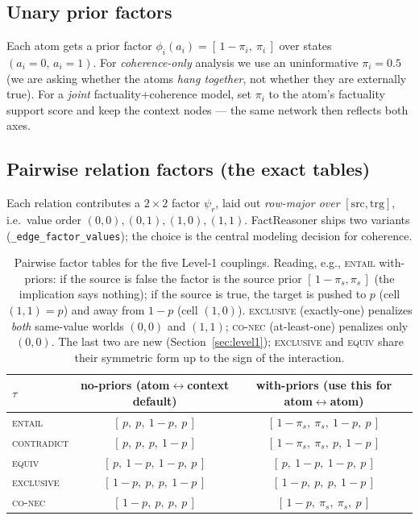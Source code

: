 \documentclass[11pt]{article}
\begin{document}
\subsection{Unary prior factors}
Each atom gets a prior factor
\(
  \phi_i(a_i)=[\,1-\pi_i,\ \pi_i\,]
\)
over states $(a_i{=}0,\,a_i{=}1)$. For \emph{coherence-only} analysis we use an uninformative
$\pi_i=0.5$ (we are asking whether the atoms \emph{hang together}, not whether they are
externally true). For a \emph{joint} factuality+coherence model, set $\pi_i$ to the atom's
factuality support score and keep the context nodes --- the same network then reflects both
axes.

\subsection{Pairwise relation factors (the exact tables)}
\label{sec:tables}
Each relation contributes a $2\times2$ factor $\psi_r$, laid out \emph{row-major over}
$[\text{src},\text{trg}]$, i.e.\ value order
$(0,0),(0,1),(1,0),(1,1)$. FactReasoner ships two variants
(\texttt{\_edge\_factor\_values}); the choice is the central modeling decision for
coherence.

\begin{table}[h]\centering\small
\renewcommand{\arraystretch}{1.25}
\begin{tabular}{@{}lcc@{}}
\toprule
$\tau$ & \textbf{no-priors} (atom$\leftrightarrow$context default)
       & \textbf{with-priors} (\textbf{use this} for atom$\leftrightarrow$atom)\\
\midrule
\textsc{entail}     & $[\,p,\ p,\ 1{-}p,\ p\,]$ & $[\,1{-}\pi_s,\ \pi_s,\ 1{-}p,\ p\,]$\\
\textsc{contradict} & $[\,p,\ p,\ p,\ 1{-}p\,]$ & $[\,1{-}\pi_s,\ \pi_s,\ p,\ 1{-}p\,]$\\
\textsc{equiv}      & $[\,p,\ 1{-}p,\ 1{-}p,\ p\,]$ & $[\,p,\ 1{-}p,\ 1{-}p,\ p\,]$\\
\textsc{exclusive}  & $[\,1{-}p,\ p,\ p,\ 1{-}p\,]$ & $[\,1{-}p,\ p,\ p,\ 1{-}p\,]$\\
\textsc{co-nec}     & $[\,1{-}p,\ p,\ p,\ p\,]$ & $[\,1{-}p,\ \pi_s,\ \pi_s,\ p\,]$\\
\bottomrule
\end{tabular}
\caption{Pairwise factor tables for the five Level-1 couplings. Reading, e.g., \textsc{entail}
with-priors: if the source is false the factor is the source prior $[\,1{-}\pi_s,\pi_s\,]$
(the implication says nothing); if the source is true, the target is pushed to $p$ (cell
$(1,1){=}p$) and away from $1{-}p$ (cell $(1,0)$). \textsc{exclusive} (exactly-one) penalizes
\emph{both} same-value worlds $(0,0)$ and $(1,1)$; \textsc{co-nec} (at-least-one) penalizes
only $(0,0)$. The last two are new (Section~\ref{sec:level1}); \textsc{exclusive} and
\textsc{equiv} share their symmetric form up to the sign of the interaction.}
\label{tab:tables}
\end{table}
\end{document}
